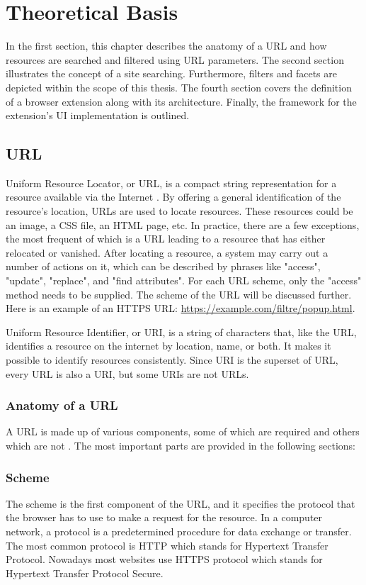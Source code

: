 \newpage
\chapter{Theoretical Basis}
In the first section, this chapter describes the anatomy of a URL and how resources are searched and filtered using URL parameters. The second section illustrates the concept of a site searching. Furthermore, filters and facets are depicted within the scope of this thesis. The fourth section covers the definition of a browser extension along with its architecture. Finally, the framework for the extension's UI implementation is outlined.


\section{URL}
Uniform Resource Locator, or URL, is a compact string representation for a resource available via the Internet \autocite{berners1994uniform}. By offering a general identification of the resource's location, URLs are used to locate resources. These resources could be an image, a CSS file, an HTML page, etc. In practice, there are a few exceptions, the most frequent of which is a URL leading to a resource that has either relocated or vanished. After locating a resource, a system may carry out a number of actions on it, which can be described by phrases like "access", "update", "replace", and "find attributes". For each URL scheme, only the "access" method needs to be supplied. The scheme of the URL will be discussed further. Here is an example of an HTTPS URL: \url{https://example.com/filtre/popup.html}.

Uniform Resource Identifier, or URI, is a string of characters that, like the URL, identifies a resource on the internet by location, name, or both. It makes it possible to identify resources consistently. Since URI is the superset of URL, every URL is also a URI, but some URIs are not URLs.

\subsection{Anatomy of a URL}
\label{url_anatomy}
A URL is made up of various components, some of which are required and others which are not \autocite{mozilla2022url}. The most important parts are provided in the following sections:

\subsection*{Scheme}
The scheme is the first component of the URL, and it specifies the protocol that the browser has to use to make a request for the resource. In a computer network, a protocol is a predetermined procedure for data exchange or transfer. The most common protocol is HTTP which stands for Hypertext Transfer Protocol. Nowadays most websites use HTTPS protocol which stands for Hypertext Transfer Protocol Secure.

